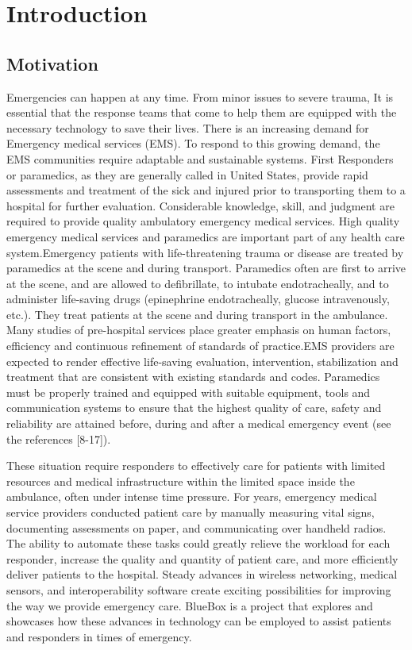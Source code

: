 \chapter{Introduction}
\section{Motivation}
Emergencies can happen at any time. From minor issues to severe trauma, It is essential that the response teams that come to help them are equipped with the necessary technology to save their lives. There is an increasing demand for Emergency medical services (EMS). To respond to this growing demand, the EMS communities require adaptable and sustainable systems. First Responders or paramedics, as they are generally called in United States, provide rapid assessments and treatment of the sick and injured prior to transporting them to a hospital for further evaluation. Considerable knowledge, skill, and judgment are required to provide quality ambulatory emergency medical services. High quality emergency medical services and paramedics are important part of any health care system.Emergency patients with life-threatening trauma or disease are treated by paramedics  at the scene and during transport. Paramedics often are first to arrive at the scene, and  are allowed to defibrillate, to intubate endotracheally, and to administer life-saving drugs (epinephrine endotracheally, glucose intravenously, etc.). They treat patients at the scene and during transport in the ambulance. Many studies of pre-hospital services place greater emphasis on human factors, efficiency and continuous refinement of standards of practice.EMS providers are expected to render effective life-saving evaluation, intervention, stabilization and treatment that are consistent with existing standards and codes. Paramedics must be properly trained and equipped with suitable equipment, tools and communication systems to ensure that the highest quality of care, safety and reliability are attained before, during and after a medical emergency event (see the references [8-17]).

These situation require responders to effectively care for patients with limited resources and medical infrastructure within the limited space inside the ambulance, often under intense time pressure. For years, emergency medical service providers conducted patient care by manually measuring vital signs, documenting assessments on paper, and communicating over handheld radios. The ability to automate these tasks could greatly relieve the workload for each responder, increase the quality and quantity of patient care, and more efficiently deliver patients to the hospital. 
Steady advances in wireless networking, medical sensors, and interoperability software create exciting possibilities for improving the way we provide emergency care. BlueBox is a project that explores and showcases how these advances in technology can be employed to assist patients and responders in times of emergency. 


